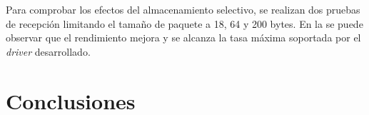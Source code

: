 \documentclass[oneside, draft]{epstfg}
\begin{document}
Para comprobar los efectos del almacenamiento selectivo, se realizan dos pruebas de recepción limitando el tamaño de paquete a 18, 64 y 200 bytes. En la  se puede observar que el rendimiento mejora y se alcanza la tasa máxima soportada por el \textit{driver} desarrollado.

\chapter{Conclusiones}

\backmatter
\appendix

\printnoidxglossaries
\cleardoublepage

\nocite{*}
{}

\cleardoublepage
\printindex
\end{document}
